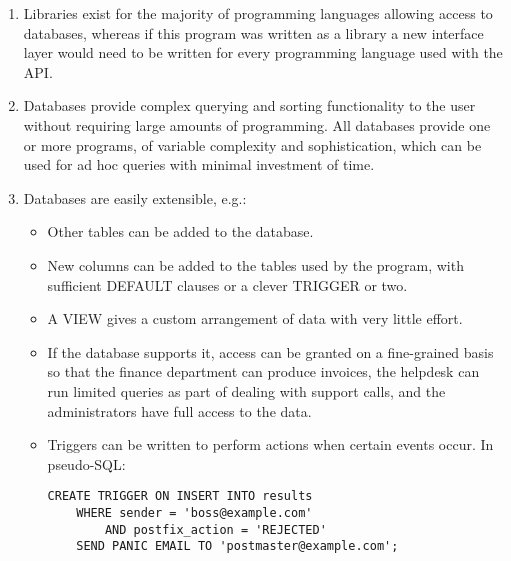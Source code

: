 \documentclass[a4paper,12pt,draft]{article}
\begin{document}
\begin{enumerate}

    \item Libraries exist for the majority of programming languages
        allowing access to databases, whereas if this program was written
        as a library a new interface layer would need to be written for
        every programming language used with the API\@.

    \item Databases provide complex querying and sorting functionality to
        the user without requiring large amounts of programming.  All
        databases provide one or more programs, of variable complexity and
        sophistication, which can be used for ad hoc queries with minimal
        investment of time.

    \item Databases are easily extensible, e.g.:
        
        \begin{itemize}

            \item Other tables can be added to the database.

            \item New columns can be added to the tables used by the
                program, with sufficient DEFAULT clauses or a clever
                TRIGGER or two.

            \item A VIEW gives a custom arrangement of data with very
                little effort.

            \item If the database supports it, access can be granted on a
                fine-grained basis so that the finance department can
                produce invoices, the helpdesk can run limited queries as
                part of dealing with support calls, and the administrators
                have full access to the data.

            \item Triggers can be written to perform actions when certain
                events occur.  In pseudo-SQL\@:

\begin{verbatim}
CREATE TRIGGER ON INSERT INTO results
    WHERE sender = 'boss@example.com'
        AND postfix_action = 'REJECTED'
    SEND PANIC EMAIL TO 'postmaster@example.com';
\end{verbatim}

        \end{itemize}

\end{enumerate}
\end{document}
